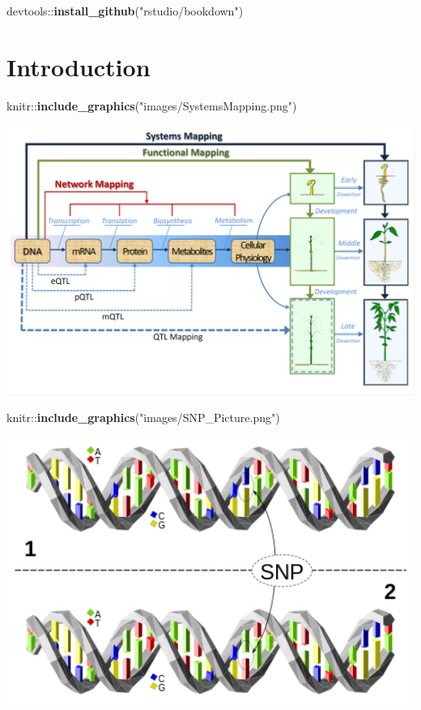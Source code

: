 \documentclass[]{book}
\newenvironment{Shaded}{\begin{snugshade}}{\end{snugshade}}
\newcommand{\KeywordTok}[1]{\textcolor[rgb]{0.13,0.29,0.53}{\textbf{{#1}}}}
\newcommand{\StringTok}[1]{\textcolor[rgb]{0.31,0.60,0.02}{{#1}}}
\newcommand{\NormalTok}[1]{{#1}}
\theoremstyle{definition}
\theoremstyle{definition}
\theoremstyle{remark}
\begin{document}
\begin{Shaded}
\begin{Highlighting}[]
\NormalTok{devtools::}\KeywordTok{install_github}\NormalTok{(}\StringTok{"rstudio/bookdown"}\NormalTok{)}
\end{Highlighting}
\end{Shaded}

\chapter{Introduction}\label{intro}

\begin{Shaded}
\begin{Highlighting}[]
\NormalTok{knitr::}\KeywordTok{include_graphics}\NormalTok{(}\StringTok{"images/SystemsMapping.png"}\NormalTok{)}
\end{Highlighting}
\end{Shaded}

\includegraphics[width=20.32in]{images/SystemsMapping}

\begin{Shaded}
\begin{Highlighting}[]
\NormalTok{knitr::}\KeywordTok{include_graphics}\NormalTok{(}\StringTok{"images/SNP_Picture.png"}\NormalTok{)}
\end{Highlighting}
\end{Shaded}

\includegraphics[width=6.35in]{images/SNP_Picture}
\end{document}
